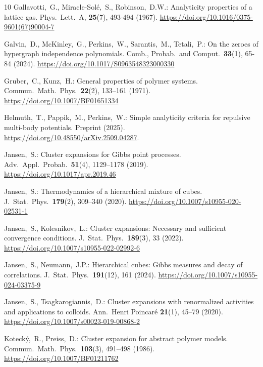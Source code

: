 \documentclass[reqno, 11pt]{amsart}
\theoremstyle{definition}
\begin{document}
\begin{thebibliography}{10}
	 Gallavotti,~G., Miracle-Sol{\'e},~S., Robinson,~D.W.: 
	Analyticity properties of a lattice gas. 
	Phys.\ Lett.\ A, \textbf{25}(7), 493-494 (1967). 
	\url{https://doi.org/10.1016/0375-9601(67)90004-7}
	
	 Galvin,~D., McKinley,~G., Perkins,~W., Sarantis,~M., Tetali,~P.: 
	On the zeroes of hypergraph independence polynomials. 
	Comb., Probab.\ and Comput.\ \textbf{33}(1), 65-84 (2024). 
	\url{https://doi.org/10.1017/S0963548323000330}
	
	 Gruber,~C., Kunz,~H.: General properties of polymer systems. Commun.\ Math.\ Phys.\ \textbf{22}(2), 133–161 (1971). \url{https://doi.org/10.1007/BF01651334}
	
	 Helmuth,~T., Pappik,~M., Perkins,~W.: 
	Simple analyticity criteria for repulsive multi-body potentials. 
	Preprint (2025). 
	\url{https://doi.org/10.48550/arXiv.2509.04287}.
	
	 Jansen,~S.: 
	Cluster expansions for Gibbs point processes. 
	Adv.\ Appl.\ Probab.\ \textbf{51}(4),  1129–1178 (2019). 
	\url{https://doi.org/10.1017/apr.2019.46} 
	
	 Jansen,~S.: 
	Thermodynamics of a hierarchical mixture of cubes. 
	J.\ Stat.\ Phys.\ \textbf{179}(2), 309–340 (2020). 
	\url{https://doi.org/10.1007/s10955-020-02531-1}
	
	 Jansen,~S., Kolesnikov,~L.: 
	Cluster expansions: Necessary and sufficient convergence conditions. 
	J.\ Stat.\ Phys.\ \textbf{189}(3), 33 (2022). 
	\url{https://doi.org/10.1007/s10955-022-02992-6}
	
	 Jansen,~S., Neumann,~J.P.: 
	Hierarchical cubes: Gibbs measures and decay of correlations. 
	J.\ Stat.\ Phys.\ \textbf{191}(12), 161 (2024). 
	\url{https://doi.org/10.1007/s10955-024-03375-9}
	
	 Jansen,~S., Tsagkarogiannis,~D.: 
	Cluster expansions with renormalized activities and applications to colloids. 
	Ann.\ Henri Poincar{\'e} \textbf{21}(1), 45–79 (2020). 
	\url{https://doi.org/10.1007/s00023-019-00868-2}
	
	 Koteck{\'y},~R., Preiss,~D.: 
	Cluster expansion for abstract polymer models. 
	Commun.\ Math.\ Phys.\ \textbf{103}(3), 491–498 (1986). 
	\url{https://doi.org/10.1007/BF01211762}
	

\end{thebibliography}
\end{document}
